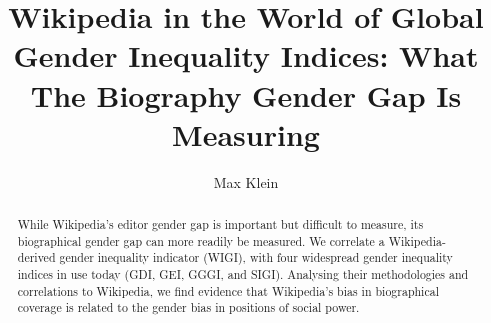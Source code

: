 \documentclass{sig-alternate}
\begin{document}
%

\title{Wikipedia in the World of Global Gender Inequality Indices: What The Biography Gender Gap Is Measuring}
%
%
%
%
%

%
\author{
%
%
\alignauthor
Max Klein
       }

\maketitle
\begin{abstract}
While Wikipedia's editor gender gap is important but difficult to measure, its biographical gender gap can more readily be measured.
We correlate a Wikipedia-derived gender inequality indicator (WIGI), with four widespread gender inequality indices in use today (GDI, GEI, GGGI, and SIGI). Analysing their methodologies and correlations to Wikipedia, we find evidence that Wikipedia's bias in biographical coverage is related to the gender bias in positions of social power.
\end{abstract}
\end{document}
